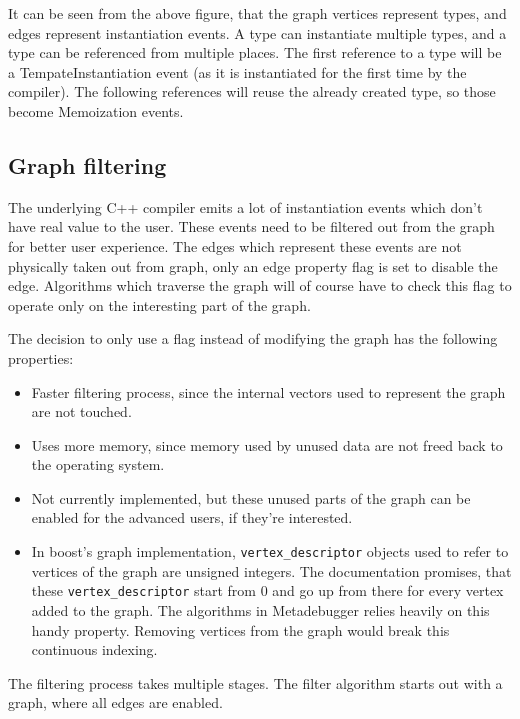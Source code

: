 \noindent
It can be seen from the above figure, that the graph vertices represent types,
and edges represent instantiation events. A type can instantiate multiple
types, and a type can be referenced from multiple places. The first reference
to a type will be a TempateInstantiation event (as it is instantiated for the
first time by the compiler). The following references will reuse the already
created type, so those become Memoization events.

\subsection{Graph filtering} \label{graph-filtering}

The underlying C++ compiler emits a lot of instantiation events which don't
have real value to the user. These events need to be filtered out from the
graph for better user experience. The edges which represent these events are
not physically taken out from graph, only an edge property flag is set to
disable the edge. Algorithms which traverse the graph will of course have to
check this flag to operate only on the interesting part of the graph.

The decision to only use a flag instead of modifying the graph has the
following properties:

\begin{itemize}
    \item
        Faster filtering process, since the internal vectors used to represent
        the graph are not touched.
    \item
        Uses more memory, since memory used by unused data are not freed back
        to the operating system.
    \item
        Not currently implemented, but these unused parts of the graph can be
        enabled for the advanced users, if they're interested.
    \item
        In boost's graph implementation, \texttt{vertex\_descriptor}
        objects used to refer to vertices of the graph are unsigned integers.
        The documentation promises, that these \texttt{vertex\_descriptor}
        start from 0 and go up from there for every vertex added to the graph.
        The algorithms in Metadebugger relies heavily on this handy property.
        Removing vertices from the graph would break this continuous indexing.
\end{itemize}

The filtering process takes multiple stages. The filter algorithm starts out
with a graph, where all edges are enabled.

